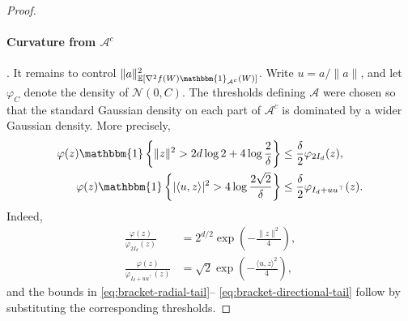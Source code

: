 \documentclass{article}
\theoremstyle{plain}
\theoremstyle{definition}
\theoremstyle{plain}
\newcommand{\E}{\mathbb E}
\newcommand{\cN}{\mathcal N}
\begin{document}
\begin{proof}
    \paragraph{Curvature from $\mathcal{A}^c$}.
    It remains to control $\|a\|_{\E[\nabla^2f(W) \mathbbm{1}_{\mathcal A^c}(W)]}^2$.
    Write $u=a/\|a\|$, and let $\varphi_C$ denote the density of
    $\cN(0,C)$. The thresholds defining $\mathcal A$ were chosen so
    that the standard Gaussian density on each part of
    $\mathcal A^c$ is dominated by a wider Gaussian density. More
    precisely,
    \begin{align}
        \varphi(z)
        \mathbbm{1}
        \left\{
        \|z\|^2>
        2d\log 2+4\log\frac{2}{\delta}
        \right\}
         & \leq
        \frac{\delta}{2}\varphi_{2I_d}(z),
        \label{eq:bracket-radial-tail}
        \\
        \varphi(z)
        \mathbbm{1}
        \left\{
        |\langle u,z\rangle|^2>
        4\log\frac{2\sqrt{2}}{\delta}
        \right\}
         & \leq
        \frac{\delta}{2}\varphi_{I_d+uu^\top}(z).
        \label{eq:bracket-directional-tail}
    \end{align}
    Indeed,
    \begin{align}
        \frac{\varphi(z)}{\varphi_{2I_d}(z)}
         & =
        2^{d/2}\exp\left(-\frac{\|z\|^2}{4}\right),
        \\
        \frac{\varphi(z)}{\varphi_{I_d+uu^\top}(z)}
         & =
        \sqrt2
        \exp\left(-\frac{\langle u,z\rangle^2}{4}\right),
    \end{align}
    and the bounds in
    \eqref{eq:bracket-radial-tail}--%
    \eqref{eq:bracket-directional-tail} follow by substituting the
    corresponding thresholds.


\end{proof}
\end{document}
